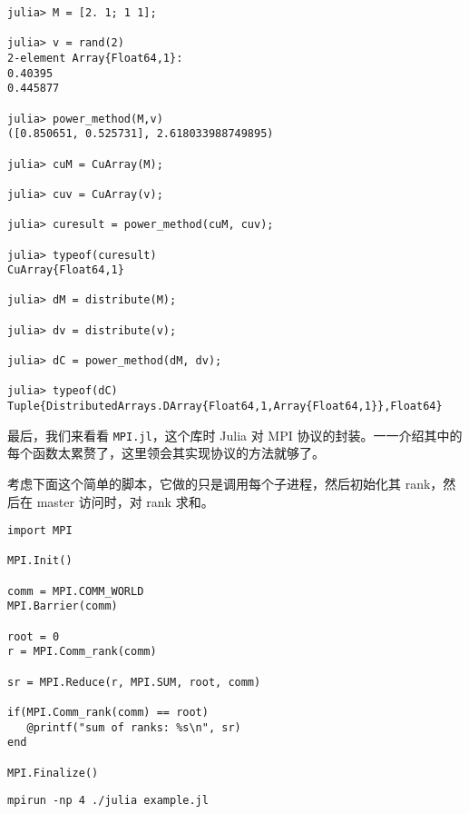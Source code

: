 \begin{verbatim}
julia> M = [2. 1; 1 1];

julia> v = rand(2)
2-element Array{Float64,1}:
0.40395
0.445877

julia> power_method(M,v)
([0.850651, 0.525731], 2.618033988749895)

julia> cuM = CuArray(M);

julia> cuv = CuArray(v);

julia> curesult = power_method(cuM, cuv);

julia> typeof(curesult)
CuArray{Float64,1}

julia> dM = distribute(M);

julia> dv = distribute(v);

julia> dC = power_method(dM, dv);

julia> typeof(dC)
Tuple{DistributedArrays.DArray{Float64,1,Array{Float64,1}},Float64}
\end{verbatim}



最后，我们来看看 \texttt{MPI.jl}，这个库时 Julia 对 MPI 协议的封装。一一介绍其中的每个函数太累赘了，这里领会其实现协议的方法就够了。



考虑下面这个简单的脚本，它做的只是调用每个子进程，然后初始化其 rank，然后在 master 访问时，对 rank 求和。




\begin{verbatim}
import MPI

MPI.Init()

comm = MPI.COMM_WORLD
MPI.Barrier(comm)

root = 0
r = MPI.Comm_rank(comm)

sr = MPI.Reduce(r, MPI.SUM, root, comm)

if(MPI.Comm_rank(comm) == root)
   @printf("sum of ranks: %s\n", sr)
end

MPI.Finalize()
\end{verbatim}




\begin{lstlisting}
mpirun -np 4 ./julia example.jl
\end{lstlisting}





